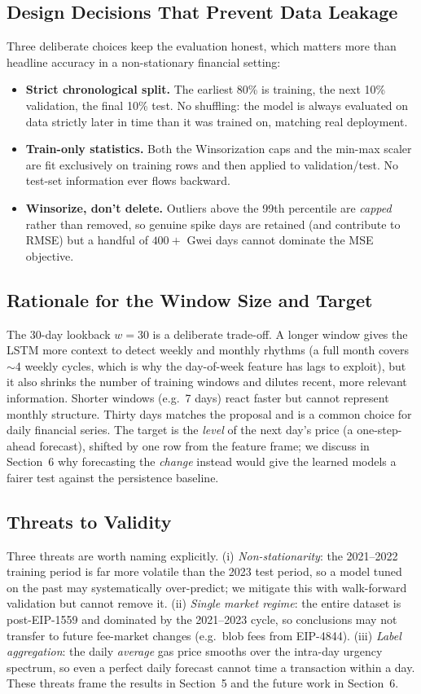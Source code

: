 \documentclass[11pt,a4paper]{article}
\begin{document}
\subsection{Design Decisions That Prevent Data Leakage}
Three deliberate choices keep the evaluation honest, which matters more than headline accuracy in
a non-stationary financial setting:
\begin{itemize}[leftmargin=1.4em]
\item \textbf{Strict chronological split.} The earliest 80\% is training, the next 10\%
validation, the final 10\% test. No shuffling: the model is always evaluated on data strictly
later in time than it was trained on, matching real deployment.
\item \textbf{Train-only statistics.} Both the Winsorization caps and the min-max scaler are fit
exclusively on training rows and then applied to validation/test. No test-set information ever
flows backward.
\item \textbf{Winsorize, don't delete.} Outliers above the 99th percentile are \emph{capped}
rather than removed, so genuine spike days are retained (and contribute to RMSE) but a handful of
$400+$ Gwei days cannot dominate the MSE objective.
\end{itemize}

\subsection{Rationale for the Window Size and Target}
The 30-day lookback $w=30$ is a deliberate trade-off. A longer window gives the LSTM more context
to detect weekly and monthly rhythms (a full month covers $\sim$4 weekly cycles, which is why the
day-of-week feature has lags to exploit), but it also shrinks the number of training windows and
dilutes recent, more relevant information. Shorter windows (e.g.\ 7 days) react faster but cannot
represent monthly structure. Thirty days matches the proposal and is a common choice for daily
financial series. The target is the \emph{level} of the next day's price (a one-step-ahead
forecast), shifted by one row from the feature frame; we discuss in Section~6 why forecasting the
\emph{change} instead would give the learned models a fairer test against the persistence
baseline.

\subsection{Threats to Validity}
Three threats are worth naming explicitly. (i) \emph{Non-stationarity}: the 2021--2022 training
period is far more volatile than the 2023 test period, so a model tuned on the past may
systematically over-predict; we mitigate this with walk-forward validation but cannot remove it.
(ii) \emph{Single market regime}: the entire dataset is post-EIP-1559 and dominated by the
2021--2023 cycle, so conclusions may not transfer to future fee-market changes (e.g.\ blob fees
from EIP-4844). (iii) \emph{Label aggregation}: the daily \emph{average} gas price smooths over
the intra-day urgency spectrum, so even a perfect daily forecast cannot time a transaction within
a day. These threats frame the results in Section~5 and the future work in Section~6.
\end{document}
